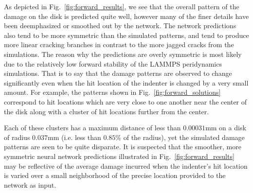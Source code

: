 As depicted in Fig.~\ref{fig:forward_results}, we see that the overall pattern of the damage on the disk is predicted quite well, however many of the finer details have been deemphasized or smoothed out by the network.  The network predictions also tend to be more symmetric than the simulated patterns, and tend to produce more linear cracking branches in contrast to the more jagged cracks from the simulations.
%
The reason why the predictions are overly symmetric is most likely due to the relatively low forward stability of the LAMMPS peridynamics simulations.  That is to say that the damage patterns are observed to change significantly even when the hit location of the indenter is changed by a very small amount.  For example, the patterns shown in Fig.~\ref{fig:forward_solutions} correspond to hit locations which are very close to one another near the center of the disk along with a cluster of hit locations further from the center.

Each of these clusters has a maximum distance of less than $0.00031$mm on a disk of radius $0.037$mm (i.e. less than $0.85\%$ of the radius), yet the simulated damage patterns are seen to be quite disparate.  It is suspected that the smoother, more symmetric neural network predictions illustrated in Fig.~\ref{fig:forward_results} may be reflective of the average damage incurred when the indenter's hit location is varied over a small neighborhood of the precise location provided to the network as input.








